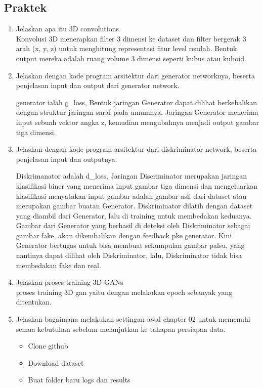 \subsection{Praktek}
\begin{enumerate}

\item Jelaskan apa itu 3D convolutions
	\hfill\\
	Konvolusi 3D menerapkan filter 3 dimensi ke dataset dan filter bergerak 3 arah (x, y, z) untuk menghitung representasi fitur level rendah. Bentuk output mereka adalah ruang volume 3 dimensi seperti kubus atau kuboid.

\item Jelaskan dengan kode program arsitektur dari generator networknya, beserta penjelasan input dan output dari generator network.


generator ialah g\_loss, Bentuk jaringan Generator dapat dilihat berkebalikan dengan struktur jaringan saraf pada umumnya. Jaringan Generator menerima input sebuah vektor angka z, kemudian mengubahnya menjadi output gambar tiga dimensi.

\item Jelaskan dengan kode program arsitektur dari diskriminator network, beserta penjelasan input dan outputnya.


Diskrimanator adalah d\_loss, Jaringan Discriminator merupakan jaringan klasifikasi biner yang menerima input gambar tiga dimensi dan mengeluarkan klasifikasi menyatakan input gambar adalah gambar asli dari dataset atau merupakan gambar buatan Generator. Diskriminator dilatih dengan dataset yang diambil dari Generator, lalu di training untuk membedakan keduanya. Gambar dari Generator yang berhasil di deteksi oleh Diskriminator sebagai gambar fake, akan dikembalikan dengan feedback pke generator. Kini Generator bertugas untuk bisa membuat sekumpulan gambar palsu, yang nantinya dapat dilihat oleh Diskriminator, lalu, Diskriminator tidak bisa membedakan fake dan real.

\item Jelaskan proses training 3D-GANs
	\hfill\\
	proses training 3D gan yaitu dengan melakukan epoch sebanyak yang ditentukan.

\item Jelaskan bagaimana melakukan settingan awal chapter 02 untuk memenuhi semua kebutuhan sebelum melanjutkan ke tahapan persiapan data.
	\hfill\\
	\begin{itemize}
		\item Clone github
		\item Download dataset
		\item Buat folder baru logs dan results
	\end{itemize}


\end{enumerate}
